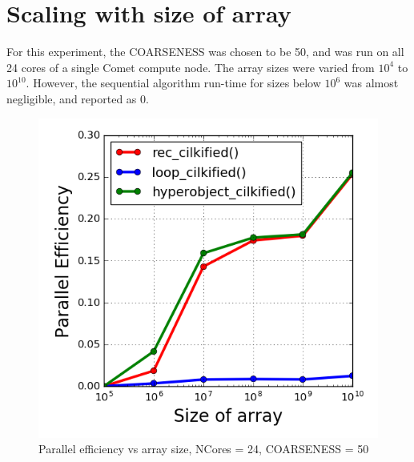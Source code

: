\documentclass[12pt,letterpaper]{article}
\begin{document}
\section*{Scaling with size of array}
\noindent For this experiment, the COARSENESS was chosen to be 50, and was run on all 24 cores of a single Comet compute node. The array sizes were varied from $10^4$ to $10^{10}$. However, the sequential algorithm run-time for sizes below $10^6$ was almost negligible, and reported as 0.
%
\begin{figure}[h]
\centering
\includegraphics[scale=0.45]{arrsize_scaling.png}
\caption{Parallel efficiency vs array size, NCores = 24, COARSENESS = 50}
\end{figure}
%
\end{document}
